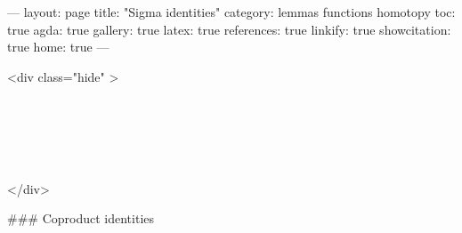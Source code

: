 ---
layout: page
title: "Sigma identities"
category: lemmas functions homotopy
toc: true
agda: true
gallery: true
latex: true
references: true
linkify: true
showcitation: true
home: true
---

<div class="hide" >
\begin{code}%
\>[0]\AgdaSymbol{\{-\#}\AgdaSpace{}%
\AgdaSpace{}%
\AgdaSpace{}%
\AgdaSymbol{\#-\}}\<%
\\
\>[0]\AgdaSpace{}%
\AgdaSpace{}%
\<%
\\
\>[0]\AgdaSpace{}%
\AgdaSpace{}%
\<%
\\
\>[0]\AgdaSpace{}%
\AgdaSpace{}%
\<%
\\
\>[0]\AgdaSpace{}%
\AgdaSpace{}%
\<%
\end{code}
</div>

### Coproduct identities

\begin{code}%
\>[0]\<%
\\
\>[0][@{}l@{\AgdaIndent{0}}]%
\>[2]\<%
\\
%
\>[2]\<%
\end{code}

